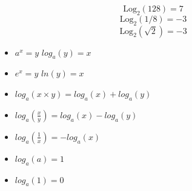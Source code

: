 \documentclass[12 pt]{article}
\begin{document}
{\Large
\[\mbox{Log}_2(128) = 7\]
\[\mbox{Log}_2(1/8) = -3\]
\[\mbox{Log}_2(\sqrt{2}) = -3\]
}
\begin{itemize}
\item $a^x = y$  $log_a(y) = x$

\item $e^x = y$  $ln(y)=x$

\item $log_a(x\times y) = log_a(x) + log_a(y)$

\item $log_a(\frac{x}{y}) = log_a(x) - log_a(y)$

\item $log_a(\frac{1}{x}) = - log_a(x)$

\item $log_a(a) = 1$

\item $log_a(1) = 0$
\end{itemize}
\end{document}
